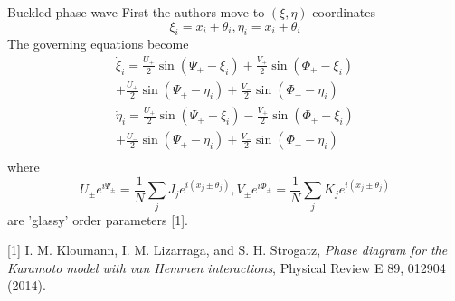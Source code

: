 \documentclass[10pt,aspectratio=43,mathserif,table]{beamer}
\begin{document}
\begin{frame}{Buckled phase wave}
    First the authors move to $(\xi, \eta)$ coordinates
    $$\xi _i=x_i+\theta _i, \eta _i=x_i+\theta _i$$
    The governing equations become
    $$
    \begin{array}{r}
        \dot{\xi}_i=\frac{U_+}{2}\sin \left( \Psi _+-\xi _i \right) +\frac{V_+}{2}\sin \left( \Phi _+-\xi _i \right)\\
        +\frac{U_+}{2}\sin \left( \Psi _+-\eta _i \right) +\frac{V_-}{2}\sin \left( \Phi _--\eta _i \right)\\
        \dot{\eta}_i=\frac{U_+}{2}\sin \left( \Psi _+-\xi _i \right) -\frac{V_+}{2}\sin \left( \Phi _+-\xi _i \right)\\
        +\frac{U_-}{2}\sin \left( \Psi _+-\eta _i \right) +\frac{V_-}{2}\sin \left( \Phi _--\eta _i \right)\\
    \end{array}
    $$
    where
    $$
    U_{\pm}e^{i\Psi _{\pm}}=\frac{1}{N}\sum_j{J_je^{i\left( x_j\pm \theta _j \right)}}, V_{\pm}e^{i\Phi _{\pm}}=\frac{1}{N}\sum_j{K_je^{i\left( x_j\pm \theta _j \right)}}
    $$
     are 'glassy' order parameters [1].
    
    [1] I. M. Kloumann, I. M. Lizarraga, and S. H. Strogatz, \textit{Phase diagram for the Kuramoto model with van Hemmen interactions}, Physical Review E 89, 012904 (2014).

\end{frame}
\end{document}
